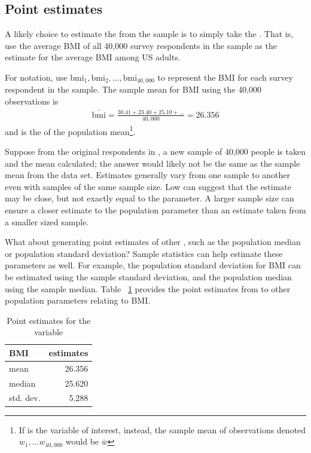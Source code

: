 \subsection{Point estimates}
\label{pointEstimates}

A likely choice to estimate the  from the  sample is to simply take the . That is, use the average BMI of all 40,000 survey respondents in the sample as the estimate for the average BMI among US adults. 

For notation, use $\mathrm{bmi}_1, \mathrm{bmi}_2, \ldots, \mathrm{bmi}_{40,000}$  to represent the BMI for each survey respondent in the  sample. The sample mean for BMI using the 40,000 observations is 
\begin{eqnarray*}
\bar{\mathrm{bmi}} = \frac{30.41 + 23.40 + 25.10 + \dots}{40,000} = 26.356
\end{eqnarray*}
and is the  of the population mean\footnote{If  is the variable of interest, instead, the sample mean of observations denoted $w_1,\ldots w_{40,000}$ would be $\bar{w}$}. 

Suppose from the original respondents in , a new sample of 40,000 people is taken and the mean calculated; the answer would likely not be the same as the sample mean from the   data set. Estimates generally vary from one sample to another even with samples of the same sample size. Low  can suggest that the estimate may be close, but not exactly equal to the parameter. A larger sample size can ensure a closer estimate to the population parameter than an estimate taken from a smaller sized sample. 

What about generating point estimates of other , such as the population median or population standard deviation? Sample statistics can help estimate these parameters as well. For example, the population standard deviation for BMI can be estimated using the sample standard deviation, and the population median using the sample median. Table ~\ref{BMIEstimates} provides the point estimates from  to other population parameters relating to BMI.

\begin{table}[ht]
\centering
\begin{tabular}{lr}
  \hline
BMI & estimates \\ 
  \hline
mean & 26.356 \\ 
  median & 25.620 \\ 
  std. dev. & 5.288 \\ 
   \hline
\end{tabular}
\caption{Point estimates for the  variable} 
\label{BMIEstimates}
\end{table}

